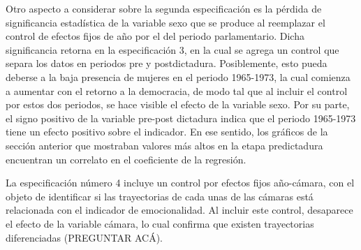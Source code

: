 \documentclass[
  12pt,
]{article}
\begin{document}
Otro aspecto a considerar sobre la segunda especificación es la pérdida
de significancia estadística de la variable sexo que se produce al
reemplazar el control de efectos fijos de año por el del periodo
parlamentario. Dicha significancia retorna en la especificación 3, en la
cual se agrega un control que separa los datos en periodos pre y
postdictadura. Posiblemente, esto pueda deberse a la baja presencia de
mujeres en el periodo 1965-1973, la cual comienza a aumentar con el
retorno a la democracia, de modo tal que al incluir el control por estos
dos periodos, se hace visible el efecto de la variable sexo. Por su
parte, el signo positivo de la variable pre-post dictadura indica que el
periodo 1965-1973 tiene un efecto positivo sobre el indicador. En ese
sentido, los gráficos de la sección anterior que mostraban valores más
altos en la etapa predictadura encuentran un correlato en el coeficiente
de la regresión.

La especificación número 4 incluye un control por efectos fijos
año-cámara, con el objeto de identificar si las trayectorias de cada
unas de las cámaras está relacionada con el indicador de emocionalidad.
Al incluir este control, desaparece el efecto de la variable cámara, lo
cual confirma que existen trayectorias diferenciadas (PREGUNTAR ACÁ).
\end{document}
